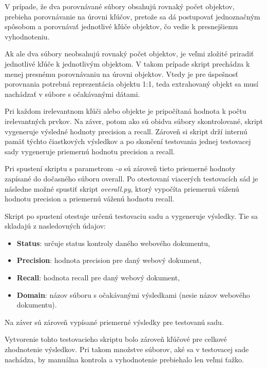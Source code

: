 V prípade, že dva porovnávané súbory obsahujú rovnaký počet objektov, prebieha porovnávanie na úrovni kľúčov, pretože sa dá postupovať jednoznačným spôsobom a porovnávať jednotlivé kľúče objektov, čo vedie k presnejšiemu vyhodnoteniu. 

Ak ale dva súbory neobsahujú rovnaký počet objektov, je veľmi zložité priradiť jednotlivé kľúče k jednotlivým objektom. V takom prípade skript prechádza k menej presnému porovnávaniu na úrovni objektov. Vtedy je pre úspešnosť porovnania potrebná reprezentácia objektu 1:1, teda extrahovaný objekt sa musí nachádzať v súbore s očakávanými dátami.

Pri každom irelevantnom kľúči alebo objekte je pripočítaná hodnota k počtu irelevantných prvkov. Na záver, potom ako sú obidva súbory skontrolované, skript vygeneruje výsledné hodnoty precision a recall. Zároveň si skript drží internú pamäť týchto čiastkových výsledkov a po skončení testovania jednej testovacej sady vygeneruje priemernú hodnotu precision a recall.

Pri spustení skriptu s parametrom \textit{-o} sú zároveň tieto priemerné hodnoty zapísané do dočasného súboru overall. Po otestovaní viacerých testovacích sád je následne možné spustiť skript \textit{overall.py}, ktorý vypočíta priemernú váženú hodnotu precision a priemernú váženú hodnotu recall.

\bigskip

Skript po spustení otestuje určenú testovaciu sadu a vygeneruje výsledky. Tie sa skladajú z nasledovných údajov:

\begin{itemize}
    \item \textbf{Status}: určuje status kontroly daného webového dokumentu,
    \item \textbf{Precision}: hodnota precision pre daný webový dokument,
    \item \textbf{Recall}: hodnota recall pre daný webový dokument,
    \item \textbf{Domain}: názov súboru s očakávanými výsledkami (nesie názov webového dokumentu).
\end{itemize}

\bigskip

Na záver sú zároveň vypísané priemerné výsledky pre testovanú sadu.

\bigskip

Vytvorenie tohto testovacieho skriptu bolo zároveň kľúčové pre celkové zhodnotenie výsledkov. Pri takom množstve súborov, aké sa v testovacej sade nachádza, by manuálna kontrola a vyhodnotenie prebiehalo len veľmi ťažko.

